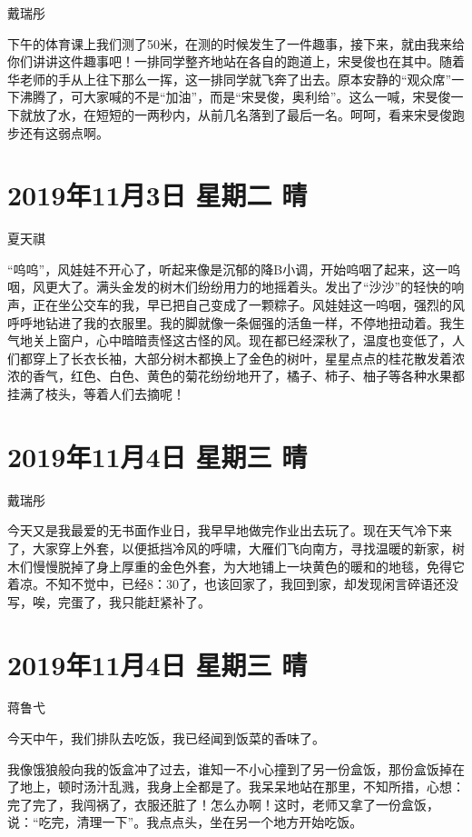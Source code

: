 戴瑞彤

下午的体育课上我们测了50米，在测的时候发生了一件趣事，接下来，就由我来给你们讲讲这件趣事吧！一排同学整齐地站在各自的跑道上，宋旻俊也在其中。随着华老师的手从上往下那么一挥，这一排同学就飞奔了出去。原本安静的``观众席''一下沸腾了，可大家喊的不是``加油''，而是``宋旻俊，奥利给''。这么一喊，宋旻俊一下就放了水，在短短的一两秒内，从前几名落到了最后一名。呵呵，看来宋旻俊跑步还有这弱点啊。

\section{2019年11月3日 星期二 晴}

夏天祺

``呜呜''，风娃娃不开心了，听起来像是沉郁的降B小调，开始呜咽了起来，这一呜咽，风更大了。满头金发的树木们纷纷用力的地摇着头。发出了``沙沙''的轻快的响声，正在坐公交车的我，早已把自己变成了一颗粽子。风娃娃这一呜咽，强烈的风呼呼地钻进了我的衣服里。我的脚就像一条倔强的活鱼一样，不停地扭动着。我生气地关上窗户，心中暗暗责怪这古怪的风。现在都已经深秋了，温度也变低了，人们都穿上了长衣长袖，大部分树木都换上了金色的树叶，星星点点的桂花散发着浓浓的香气，红色、白色、黄色的菊花纷纷地开了，橘子、柿子、柚子等各种水果都挂满了枝头，等着人们去摘呢！

\section{2019年11月4日 星期三 晴}

戴瑞彤

今天又是我最爱的无书面作业日，我早早地做完作业出去玩了。现在天气冷下来了，大家穿上外套，以便抵挡冷风的呼啸，大雁们飞向南方，寻找温暖的新家，树木们慢慢脱掉了身上厚重的金色外套，为大地铺上一块黄色的暖和的地毯，免得它着凉。不知不觉中，已经8：30了，也该回家了，我回到家，却发现闲言碎语还没写，唉，完蛋了，我只能赶紧补了。

\section{2019年11月4日 星期三 晴}

蒋鲁弋

今天中午，我们排队去吃饭，我已经闻到饭菜的香味了。

我像饿狼般向我的饭盒冲了过去，谁知一不小心撞到了另一份盒饭，那份盒饭掉在了地上，顿时汤汁乱溅，我身上全都是了。我呆呆地站在那里，不知所措，心想：完了完了，我闯祸了，衣服还脏了！怎么办啊！这时，老师又拿了一份盒饭，说：``吃完，清理一下''。我点点头，坐在另一个地方开始吃饭。

